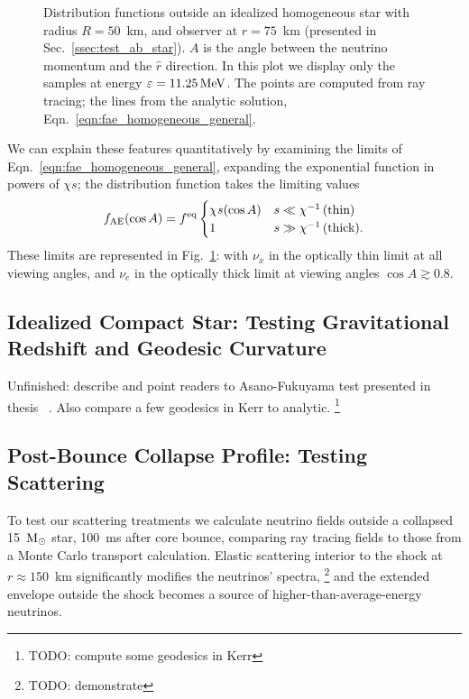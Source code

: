 \documentclass[aps,floatfix,prd,superscriptaddress,twocolumn]{revtex4-1}
\begin{document}
\begin{figure}
  \resizebox{\columnwidth}{!}{}
  \caption{Distribution functions outside an idealized homogeneous star
    with radius $R=50$~km, and observer at $r=75$~km
    (presented in Sec.~\ref{ssec:test_ab_star}).
    $A$ is the angle between the neutrino momentum and the $\hat{r}$ direction.
    In this plot we display only the samples at energy
    $\varepsilon=11.25\,{\rm MeV}$.
    The points are computed from ray tracing; the lines from the analytic
    solution, Eqn.~\ref{eqn:fae_homogeneous_general}.
  }
  \label{fig:f_absorption_sphere}
\end{figure}

We can explain these features quantitatively by examining the limits
of Eqn.~\ref{eqn:fae_homogeneous_general}, expanding the exponential function
in powers of $\chi s$; the distribution function takes the limiting values
\begin{equation}
  \label{eqn:fae_homogeneous_limits}
  f_{\rm AE}(\cos A) = f^{\rm eq}
  \begin{cases}
    \chi s(\cos A) & s \ll \chi^{-1}\,\textrm{(thin)}\\
    1                  & s \gg \chi^{-1}\,\textrm{(thick)}.
  \end{cases}
\end{equation}
These limits are represented in Fig.~\ref{fig:f_absorption_sphere}:
with $\nu_x$ in the optically thin limit at all viewing angles,
and $\nu_e$ in the optically thick limit at viewing angles
$\cos A \gtrsim 0.8$.

\subsection{Idealized Compact Star:
  Testing Gravitational Redshift and Geodesic Curvature}
\label{ssec:test_gravity}
Unfinished: describe and point readers to Asano-Fukuyama test presented
in thesis ~\cite[Sec.~4.3.3]{deat2015-thesis}.
Also compare a few geodesics in Kerr to analytic.
\footnote{TODO: compute some geodesics in Kerr}

\subsection{Post-Bounce Collapse Profile:
  Testing Scattering}
\label{ssec:test_collapse}
To test our scattering treatments we calculate neutrino fields outside a
collapsed 15~${\rm M}_\odot$ star, 100~ms after core bounce,
comparing ray tracing fields to those from a Monte Carlo transport calculation.
Elastic scattering interior to the shock at $r\approx150$~km
significantly modifies the neutrinos' spectra,
\footnote{TODO: demonstrate}
and the extended envelope outside the shock becomes a source of
higher-than-average-energy neutrinos.
\end{document}
